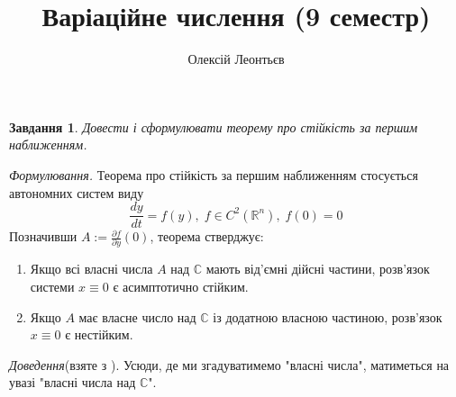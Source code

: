 \documentclass[12pt]{article} %
\title{Варіаційне числення (9 семестр)}
\author{Олексій Леонтьєв}
\newtheorem{prob}{Завдання}
\begin{document}
\maketitle
\begin{prob}Довести і сформулювати теорему про стійкість за першим наближенням.\end{prob}%
	{\it Формулювання. }Теорема про стійкість за першим наближенням стосується автономних систем виду
	\[\frac{dy}{dt}=f(y),\;f\in C^2(\mathbb{R}^n),\;f(0)=0\]
	Позначивши $A:=\frac{\partial f}{\partial y}(0)$, теорема стверджує:
	\begin{enumerate}
		\item Якщо всі власні числа $A$ над $\mathbb{C}$ мають від’ємні дійсні частини, розв’язок системи $x\equiv0$ є
			асимптотично стійким.
		\item Якщо $A$ має власне число над $\mathbb{C}$ із додатною власною частиною, розв’язок $x\equiv0$ є нестійким.
	\end{enumerate}
	{\it Доведення}(взяте з \cite{perestyuk}).
	Усюди, де ми згадуватимемо "власні числа", матиметься на увазі "власні числа над $\mathbb{C}$".
\end{document}
